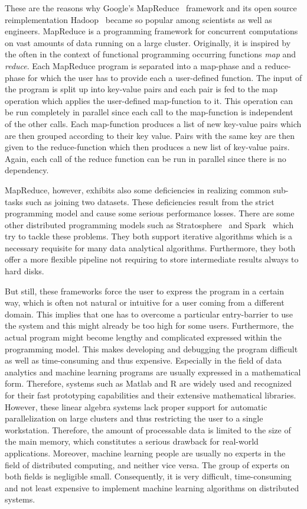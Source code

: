 \documentclass{dima}
\begin{document}
These are the reasons why Google's MapReduce~\cite{dean:c2008a} framework and its open source reimplementation Hadoop~\cite{hadoop:2008a} became so popular among scientists as well as engineers.
MapReduce is a programming framework for concurrent computations on vast amounts of data running on a large cluster. 
Originally, it is inspired by the often in the context of functional programming occurring functions \emph{map} and \emph{reduce}.
Each MapReduce program is separated into a map-phase and a reduce-phase for which the user has to provide each a user-defined function.
The input of the program is split up into key-value pairs and each pair is fed to the map operation which applies the user-defined map-function to it.
This operation can be run completely in parallel since each call to the map-function is independent of the other calls.
Each map-function produces a list of new key-value pairs which are then grouped according to their key value.
Pairs with the same key are then given to the reduce-function which then produces a new list of key-value pairs.
Again, each call of the reduce function can be run in parallel since there is no dependency.

MapReduce, however, exhibits also some deficiencies in realizing common sub-tasks such as joining two datasets.
These deficiencies result from the strict programming model and cause some serious performance losses.
There are some other distributed programming models such as Stratosphere~\cite{battre:2010a} and Spark~\cite{zaharia:2010a} which try to tackle these problems.
They both support iterative algorithms which is a necessary requisite for many data analytical algorithms.
Furthermore, they both offer a more flexible pipeline not requiring to store intermediate results always to hard disks.

But still, these frameworks force the user to express the program in a certain way, which is often not natural or intuitive for a user coming from a different domain.
This implies that one has to overcome a particular entry-barrier to use the system and this might already be too high for some users.
Furthermore, the actual program might become lengthy and complicated expressed within the programming model.
This makes developing and debugging the program difficult as well as time-consuming and thus expensive.
Especially in the field of data analytics and machine learning programs are usually expressed in a mathematical form.
Therefore, systems such as Matlab and R are widely used and recognized for their fast prototyping capabilities and their extensive mathematical libraries.
However, these linear algebra systems lack proper support for automatic parallelization on large clusters and thus restricting the user to a single workstation.
Therefore, the amount of processable data is limited to the size of the main memory, which constitutes a serious drawback for real-world applications.
Moreover, machine learning people are usually no experts in the field of distributed computing, and neither vice versa.
The group of experts on both fields is negligible small.
Consequently, it is very difficult, time-consuming and not least expensive to implement machine learning algorithms on distributed systems.
\end{document}
